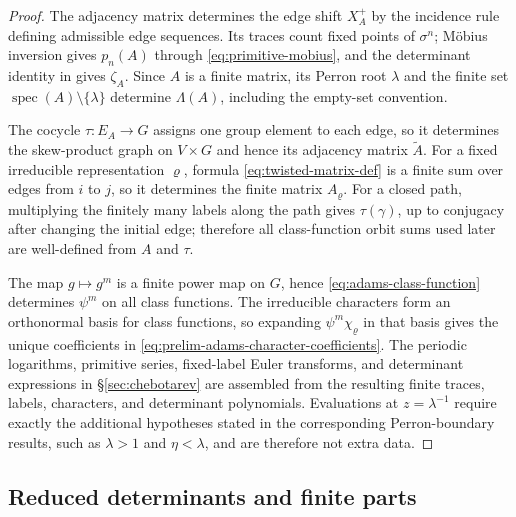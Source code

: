 \documentclass[11pt,a4paper]{amsart}
\theoremstyle{plain}
\theoremstyle{definition}
\theoremstyle{remark}
\DeclareMathOperator{\spec}{spec}
\begin{document}
\begin{proof}
  The adjacency matrix determines the edge shift \(X_A^+\) by the
  incidence rule defining admissible edge sequences. Its traces count
  fixed points of \(\sigma^n\); M\"obius inversion gives
  \(p_n(A)\) through \eqref{eq:primitive-mobius}, and the determinant
  identity in  gives \(\zeta_A\).
  Since \(A\) is a finite matrix, its Perron root \(\lambda\) and the
  finite set \(\spec(A)\setminus\{\lambda\}\) determine
  \(\Lambda(A)\), including the empty-set convention.

  The cocycle \(\tau:E_A\to G\) assigns one group element to each edge,
  so it determines the skew-product graph on \(V\times G\) and hence its
  adjacency matrix \(\widetilde A\). For a fixed irreducible
  representation \(\varrho\), formula \eqref{eq:twisted-matrix-def}
  is a finite sum over edges from \(i\) to \(j\), so it determines the
  finite matrix \(A_\varrho\). For a closed path, multiplying the finitely
  many labels along the path gives \(\tau(\gamma)\), up to conjugacy
  after changing the initial edge; therefore all class-function orbit
  sums used later are well-defined from \(A\) and \(\tau\).

  The map \(g\mapsto g^m\) is a finite power map on \(G\), hence
  \eqref{eq:adams-class-function} determines \(\psi^m\) on all class
  functions. The irreducible characters form an orthonormal basis for
  class functions, so expanding \(\psi^m\chi_\varrho\) in that basis gives
  the unique coefficients in
  \eqref{eq:prelim-adams-character-coefficients}. The periodic
  logarithms, primitive series, fixed-label Euler transforms, and
  determinant expressions in \S\ref{sec:chebotarev} are assembled from
  the resulting finite traces, labels, characters, and determinant
  polynomials. Evaluations at \(z=\lambda^{-1}\) require exactly the
  additional hypotheses stated in the corresponding Perron-boundary
  results, such as \(\lambda>1\) and \(\eta<\lambda\), and are therefore
  not extra data.
\end{proof}

\subsection{Reduced determinants and finite parts}
\end{document}
